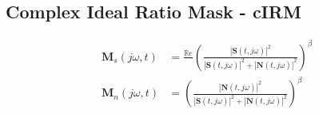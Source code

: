 \subsection{Complex Ideal Ratio Mask - cIRM}
\begin{align}
    \mathbf{M}_{s}(j\omega, t) & = \frac{ \mathbb{R}e }{  }  {\left( \frac{|\mathbf{S}(t,j\omega)|^2}{|\mathbf{S}(t,j\omega)|^2 + |\mathbf{N}(t,j\omega)|^2} \right)}^{\beta}                           \\
    \mathbf{M}_{n}(j\omega, t) & = {\left( \frac{|\mathbf{N}(t,j\omega)|^2}{|\mathbf{S}(t,j\omega)|^2 + |\mathbf{N}(t,j\omega)|^2} \right)}^{\beta}
\end{align}